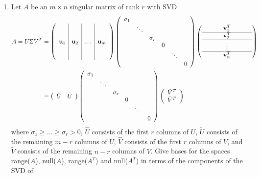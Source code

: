 \documentclass{article}
\renewcommand{\vec}[1]{\mathbf{#1}}
\begin{document}
\begin{enumerate}
\item Let $A$ be an $m \times n$ singular matrix of rank $r$ with SVD
\begin{align*}
A = U \Sigma V^T &= 
\left( \begin{array}{c|c|c|c} &&& \\ &&& \\ \vec{u}_1 & \vec{u}_2 & \ldots & \vec{u}_m \\ &&& \\ &&&  \end{array} \right)
\left( \begin{array}{cccccc} \sigma_1 &&&&& \\ & \ddots &&&& \\ && \sigma_r &&& \\ &&& 0 &&\\ &&&& \ddots &\\  &&&&& 0 \end{array} \right)
\left( \begin{array}{ccccccc} &&& \vec{v}_1^T &&& \\ \hline &&& \vec{v}_2^T &&& \\ \hline &&& \vdots &&& \\ \hline &&&
    \vec{v}_n^T &&&  \end{array} \right) \\
& = \left( \begin{array}{cc} \hat{U} & \tilde{U} \end{array} \right) 
\left( \begin{array}{cccccc} \sigma_1 &&&&& \\ & \ddots &&&& \\ && \sigma_r &&& \\ &&& 0 &&\\ &&&& \ddots &\\  &&&&& 0 \end{array} \right)
\left( \begin{array}{c} \hat{V}^T \\ \tilde{V}^T \end{array} \right) \\
\end{align*}
where $\sigma_1 \geq  \ldots \geq \sigma_r > 0$, $\hat{U}$ consists of the first $r$ columns of $U$, $\tilde{U}$ consists of the remaining $m-r$ columns of $U$,
$\hat{V}$ consists of the first $r$ columns of $V$, and $\tilde{V}$ consists of the remaining $n-r$ columns of $V$.
Give bases for the spaces range($A$), null($A$), range($A^T$) and null($A^T$) in terms of the components of the SVD of

\end{enumerate}
\end{document}
